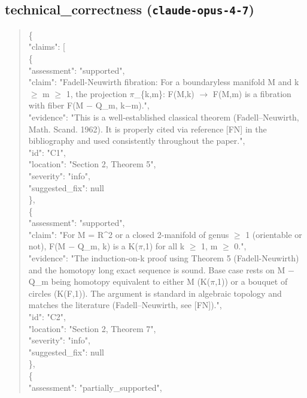 \documentclass[11pt]{article}
\begin{document}
\subsection*{technical\_correctness (\texttt{claude-opus-4-7})}
\begin{quote}\small\ttfamily\raggedright
\{\\
  "claims": [\\
    \{\\
      "assessment": "supported",\\
      "claim": "Fadell-Neuwirth fibration: For a boundaryless manifold M and k \ensuremath{\ge} m \ensuremath{\ge} 1, the projection \ensuremath{\pi}\_\{k,m\}: F(M,k) \ensuremath{\to} F(M,m) is a fibration with fiber F(M \ensuremath{-} Q\_m, k\ensuremath{-}m).",\\
      "evidence": "This is a well-established classical theorem (Fadell--Neuwirth, Math. Scand. 1962). It is properly cited via reference [FN] in the bibliography and used consistently throughout the paper.",\\
      "id": "C1",\\
      "location": "Section 2, Theorem 5",\\
      "severity": "info",\\
      "suggested\_fix": null\\
    \},\\
    \{\\
      "assessment": "supported",\\
      "claim": "For M = R\^{}2 or a closed 2-manifold of genus \ensuremath{\ge} 1 (orientable or not), F(M \ensuremath{-} Q\_m, k) is a K(\ensuremath{\pi},1) for all k \ensuremath{\ge} 1, m \ensuremath{\ge} 0.",\\
      "evidence": "The induction-on-k proof using Theorem 5 (Fadell-Neuwirth) and the homotopy long exact sequence is sound. Base case rests on M \ensuremath{-} Q\_m being homotopy equivalent to either M (K(\ensuremath{\pi},1)) or a bouquet of circles (K(F,1)). The argument is standard in algebraic topology and matches the literature (Fadell--Neuwirth, see [FN]).",\\
      "id": "C2",\\
      "location": "Section 2, Theorem 7",\\
      "severity": "info",\\
      "suggested\_fix": null\\
    \},\\
    \{\\
      "assessment": "partially\_supported",\\

\end{quote}
\end{document}
